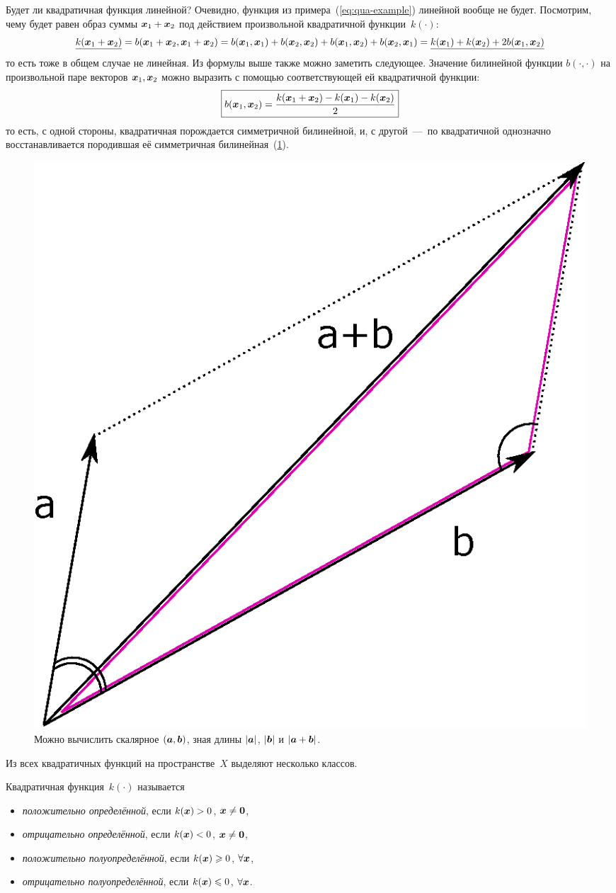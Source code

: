 \documentclass[a4paper,12pt]{article}
\begin{document}
  Будет ли квадратичная функция линейной?
  Очевидно, функция из примера~(\ref{eq:qua-example}) линейной вообще не будет.
  Посмотрим, чему будет равен образ суммы $\bds x_1 \hm+ \bds x_2$ под действием произвольной квадратичной функции~$k(\cdot)$:
  \[
    \underline{k(\boldsymbol x_1 + \boldsymbol x_2)}
    = b(\boldsymbol x_1 + \boldsymbol x_2, \boldsymbol x_1 + \boldsymbol x_2)
    = b(\boldsymbol x_1, \boldsymbol x_1) + b(\boldsymbol x_2, \boldsymbol x_2) + b(\boldsymbol x_1, \boldsymbol x_2) + b(\boldsymbol x_2, \boldsymbol x_1)
    = \underline{k(\boldsymbol x_1) + k(\boldsymbol x_2) + 2 b(\boldsymbol x_1, \boldsymbol x_2)}
  \]
  то есть тоже в общем случае не линейная.
  Из формулы выше также можно заметить следующее.
  Значение билинейной функции $b(\cdot, \cdot)$ на произвольной паре векторов $\boldsymbol x_1, \boldsymbol x_2$ можно выразить с помощью соответствующей ей квадратичной функции:
  \[
    \boxed{
      b(\boldsymbol x_1, \boldsymbol x_2) = \frac{k(\boldsymbol x_1 + \boldsymbol x_2) - k(\boldsymbol x_1) - k(\boldsymbol x_2)}{2}
    }
  \]
  то есть, с одной стороны, квадратичная порождается симметричной билинейной, и, с другой~---~по квадратичной однозначно восстанавливается породившая её симметричная билинейная~(\ref{fig:vector-scalar}).
  
  \begin{figure}[h!]
    \centering
  
    \includegraphics[width=0.5\columnwidth]{vector-scalar}
  
    \caption{Можно вычислить скалярное $(\boldsymbol a, \boldsymbol b)$, зная длины $|\boldsymbol a|$, $|\boldsymbol b|$ и $|\bds a \hm+ \bds b|$.}
    \label{fig:vector-scalar}
  \end{figure}
  
  Из всех квадратичных функций на пространстве~$X$ выделяют несколько классов.
  
  \begin{definition}
    Квадратичная функция~$k(\cdot)$ называется
    \begin{itemize}
      \item \emph{положительно определённой}, если $k(\bds x) \hm> 0$, $\bds x \hm{\not=} \bds 0$,
      \item \emph{отрицательно определённой}, если $k(\bds x) \hm< 0$, $\bds x \hm{\not=} \bds 0$,
      \item \emph{положительно полуопределённой}, если $k(\bds x) \hm\geq 0$, $\forall \boldsymbol x$,
      \item \emph{отрицательно полуопределённой}, если $k(\bds x) \hm\leq 0$, $\forall \boldsymbol x$.
    \end{itemize}
  \end{definition}
  
\end{document}
